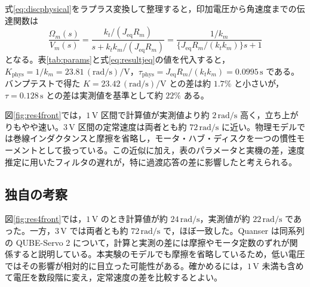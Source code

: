 式\eqref{eq:discphysical}をラプラス変換して整理すると，印加電圧から角速度までの伝達関数は
\begin{equation}
 \frac{\Omega_m(s)}{V_m(s)}
 =\frac{k_t/(J_{\mathrm{eq}}R_m)}{s+k_tk_m/(J_{\mathrm{eq}}R_m)}
 =\frac{1/k_m}{\{J_{\mathrm{eq}}R_m/(k_tk_m)\}s+1}
 \label{eq:discphysicaltf}
\end{equation}
となる。表\ref{tab:params}と式\eqref{eq:resultjeq}の値を代入すると，$K_{\mathrm{phys}}=1/k_m=23.81\,\mathrm{(rad/s)/V}$，$\tau_{\mathrm{phys}}=J_{\mathrm{eq}}R_m/(k_tk_m)=0.0995\,\mathrm{s}$ である。バンプテストで得た $K=23.42\,\mathrm{(rad/s)/V}$ との差は約 $1.7\%$ と小さいが，$\tau=0.128\,\mathrm{s}$ との差は実測値を基準として約 $22\%$ ある。

図\ref{fig:res4front}では，$1\,\mathrm{V}$ 区間で計算値が実測値より約 $2\,\mathrm{rad/s}$ 高く，立ち上がりもやや速い。$3\,\mathrm{V}$ 区間の定常速度は両者とも約 $72\,\mathrm{rad/s}$ に近い。物理モデルでは巻線インダクタンスと摩擦を省略し，モータ・ハブ・ディスクを一つの慣性モーメントとして扱っている。この近似に加え，表のパラメータと実機の差，速度推定に用いたフィルタの遅れが，特に過渡応答の差に影響したと考えられる。

\subsection{独自の考察}
図\ref{fig:res4front}では，$1\,\mathrm{V}$ のとき計算値が約 $24\,\mathrm{rad/s}$，実測値が約 $22\,\mathrm{rad/s}$ であった。一方，$3\,\mathrm{V}$ では両者とも約 $72\,\mathrm{rad/s}$ で，ほぼ一致した。Quanser は同系列の QUBE-Servo 2 について，計算と実測の差には摩擦やモータ定数のずれが関係すると説明している\cite{quanser_friction}。本実験のモデルでも摩擦を省略しているため，低い電圧ではその影響が相対的に目立った可能性がある。確かめるには，$1\,\mathrm{V}$ 未満も含めて電圧を数段階に変え，定常速度の差を比較するとよい。
